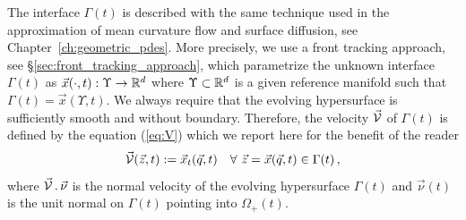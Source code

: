 The interface $\Gamma(t)$ is described with the same technique used in the
approximation of mean curvature flow and surface diffusion, see
Chapter~\ref{ch:geometric_pdes}. More precisely, we use a front tracking
approach, see \S\ref{sec:front_tracking_approach}, which parametrize the
unknown interface $\Gamma(t)$ as $\vec x(\cdot,t):\Upsilon\to\mathbb R^d$ where
$\Upsilon\subset\mathbb R^d$ is a given reference manifold such that $\Gamma(t) = \vec
x(\Upsilon,t)$. We always require that the evolving hypersurface is sufficiently
smooth and without boundary. Therefore, the velocity $\vec{\mathcal{V}}$ of $\Gamma(t)$ is
defined by the equation (\ref{eq:V}) which we report here for the benefit of
the reader
\begin{equation*}
\vec{\mathcal{V}}(\vec z, t) := \vec x_t(\vec q, t) \quad
\forall\ \vec z = \vec x(\vec q,t) \in \Gamma(t)\,,
\end{equation*}
where $\vec{\mathcal{V}} \,.\,\vec \nu$ is the normal velocity of the evolving hypersurface
$\Gamma(t)$ and $\vec\nu(t)$ is the unit normal on $\Gamma(t)$ pointing into
$\Omega_+(t)$.

